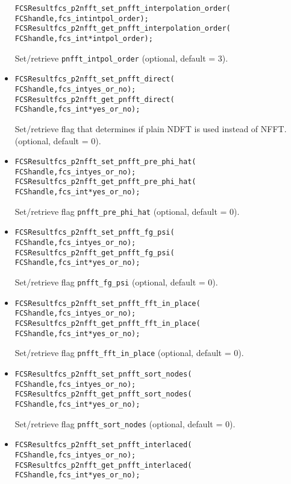 \begin{itemize}
\begin{alltt}
FCSResult fcs_p2nfft_set_pnfft_interpolation_order(
    FCS handle, fcs_int intpol_order);
FCSResult fcs_p2nfft_get_pnfft_interpolation_order(
    FCS handle, fcs_int* intpol_order);
\end{alltt}
    Set/retrieve \verb!pnfft_intpol_order! (optional, default = 3).
  \item
\begin{alltt}
FCSResult fcs_p2nfft_set_pnfft_direct(
    FCS handle, fcs_int yes_or_no);
FCSResult fcs_p2nfft_get_pnfft_direct(
    FCS handle, fcs_int* yes_or_no);
\end{alltt}
    Set/retrieve flag that determines if plain NDFT is used instead of NFFT.
    (optional, default = 0).
  \item
\begin{alltt}
FCSResult fcs_p2nfft_set_pnfft_pre_phi_hat(
    FCS handle, fcs_int yes_or_no);
FCSResult fcs_p2nfft_get_pnfft_pre_phi_hat(
    FCS handle, fcs_int* yes_or_no);
\end{alltt}
    Set/retrieve flag \verb!pnfft_pre_phi_hat! (optional, default = 0).
  \item
\begin{alltt}
FCSResult fcs_p2nfft_set_pnfft_fg_psi(
    FCS handle, fcs_int yes_or_no);
FCSResult fcs_p2nfft_get_pnfft_fg_psi(
    FCS handle, fcs_int* yes_or_no);
\end{alltt}
    Set/retrieve flag \verb!pnfft_fg_psi! (optional, default = 0).
  \item
\begin{alltt}
FCSResult fcs_p2nfft_set_pnfft_fft_in_place(
    FCS handle, fcs_int yes_or_no);
FCSResult fcs_p2nfft_get_pnfft_fft_in_place(
    FCS handle, fcs_int* yes_or_no);
\end{alltt}
    Set/retrieve flag \verb!pnfft_fft_in_place! (optional, default = 0).
  \item
\begin{alltt}
FCSResult fcs_p2nfft_set_pnfft_sort_nodes(
    FCS handle, fcs_int yes_or_no);
FCSResult fcs_p2nfft_get_pnfft_sort_nodes(
    FCS handle, fcs_int* yes_or_no);
\end{alltt}
    Set/retrieve flag \verb!pnfft_sort_nodes! (optional, default = 0).
  \item
\begin{alltt}
FCSResult fcs_p2nfft_set_pnfft_interlaced(
    FCS handle, fcs_int yes_or_no);
FCSResult fcs_p2nfft_get_pnfft_interlaced(
    FCS handle, fcs_int* yes_or_no);
\end{alltt}

\end{itemize}
